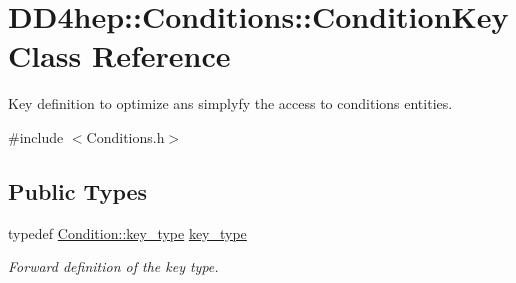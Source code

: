 \hypertarget{class_d_d4hep_1_1_conditions_1_1_condition_key}{}\section{D\+D4hep\+:\+:Conditions\+:\+:Condition\+Key Class Reference}
\label{class_d_d4hep_1_1_conditions_1_1_condition_key}


Key definition to optimize ans simplyfy the access to conditions entities.  




{\ttfamily \#include $<$Conditions.\+h$>$}

\subsection*{Public Types}
\begin{DoxyCompactItemize}
\item 
typedef \hyperlink{class_d_d4hep_1_1_conditions_1_1_condition_a7528efa762e8cc072ef80ea67c3531f9}{Condition\+::key\+\_\+type} \hyperlink{class_d_d4hep_1_1_conditions_1_1_condition_key_a08bfc8ccb807bdd5e4d9f3b065d1c8f5}{key\+\_\+type}
\begin{DoxyCompactList}\small\item\em Forward definition of the key type. \end{DoxyCompactList}\end{DoxyCompactItemize}
